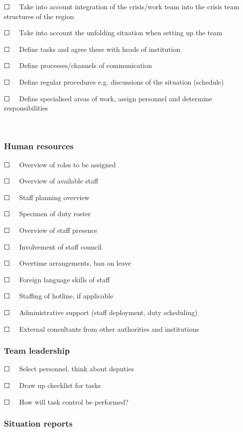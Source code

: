 \documentclass{article}
\begin{document}
☐   Take into account integration of the crisis/work team into the crisis team structures of the region


☐   Take into account the unfolding situation when setting up the team


☐   Define tasks and agree these with heads of institution


☐   Define processes/channels of communication


☐   Define regular procedures e.g. discussions of the situation (schedule)


☐   Define specialised areas of work, assign personnel and determine responsibilities


 


\subsubsection{Human resources}\label{H6553733}



☐   Overview of roles to be assigned


☐   Overview of available staff


☐   Staff planning overview


☐   Specimen of duty roster


☐   Overview of staff presence 


☐   Involvement of staff council 


☐   Overtime arrangements, ban on leave


☐   Foreign language skills of staff


☐   Staffing of hotline, if applicable


☐   Administrative support (staff deployment, duty scheduling)


☐   External consultants from other authorities and institutions 


\subsubsection{Team leadership}\label{H1488738}



☐   Select personnel, think about deputies 


☐   Draw up checklist for tasks


☐   How will task control be performed? 


\subsubsection{Situation reports }\label{H3845044}
\end{document}

